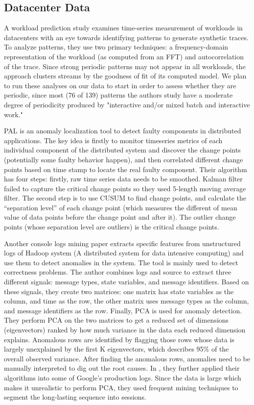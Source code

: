 \subsection{Datacenter Data}
A workload prediction study \cite{Gmach2007} examines time-series measurement of workloads in datacenters with an eye towards identifying patterns to generate synthetic traces. To analyze patterns, they use two primary techniques: a frequency-domain representation of the workload (as computed from an FFT) and autocorrelation of the trace. Since strong periodic patterns may not appear in all workloads, the approach clusters streams by the goodness of fit of its computed model. We plan to run these analyses on our data to start in order to assess whether they are periodic, since most (76 of 139) patterns the authors study have a moderate degree of periodicity produced by "interactive and/or mixed batch and interactive work."

PAL is an anomaly localization tool to detect faulty components in distributed applications. The key idea is firstly to monitor timeseries metrics of each individual component of the distributed system and discover the change points (potentially some faulty behavior happen), and then correlated different change points based on time stamp to locate the real faulty component. Their algorithm has four steps: firstly, raw time series data needs to be smoothed. Kalman filter failed to capture the critical change points so they used 5-length moving average filter. The second step is to use CUSUM to find change points, and calculate the “separation level” of each change point (which measures the different of mean value of data points before the change point and after it). The outlier change points (whose separation level are outliers) is the critical change points.

Another console logs mining paper \cite{xu2009} extracts specific features from unstructured logs of Hadoop system \cite{Hadoop} (A distributed system for data intensive computing) and use them to detect anomalies in the system. The tool is mainly used to detect correctness problems. The author combines logs and source to extract three different signals: message types, state variables, and message identifiers. Based on these signals, they create two matrices: one matrix has state variables as the column, and time as the row, the other matrix uses message types as the column, and message identifiers as the row. Finally, PCA is used for anomaly detection. They perform PCA on the two matrices to get a reduced set of dimensions (eigenvectors) ranked by how much variance in the data each reduced dimension explains. Anomalous rows are identified by flagging those rows whose data is largely unexplained by the first K eigenvectors, which describes 95\% of the overall observed variance. 
After finding the anomalous rows, anomalies need to be manually interpreted to dig out the root causes. In \cite{xu2010}, they further applied their algorithms into some of Google's production logs. Since the data is large which makes it unrealistic to perform PCA, they used frequent mining techniques to segment the long-lasting sequence into sessions.

